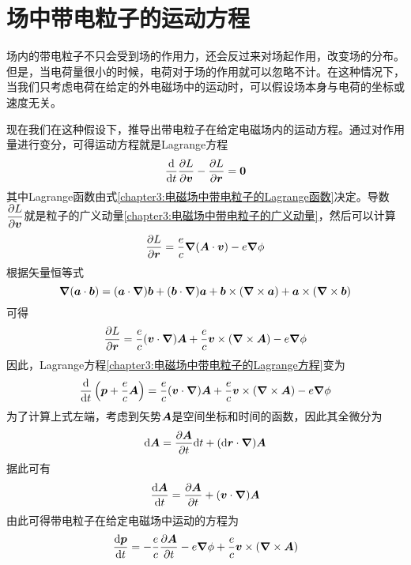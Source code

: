 \section{场中带电粒子的运动方程}

场内的带电粒子不只会受到场的作用力，还会反过来对场起作用，改变场的分布。但是，当电荷量很小的时候，电荷对于场的作用就可以忽略不计。在这种情况下，当我们只考虑电荷在给定的外电磁场中的运动时，可以假设场本身与电荷的坐标或速度无关。

现在我们在这种假设下，推导出带电粒子在给定电磁场内的运动方程。通过对作用量进行变分，可得运动方程就是Lagrange方程
\begin{equation}
	\frac{\mathrm{d}}{\mathrm{d} t} \frac{\partial L}{\partial \boldsymbol{v}} - \frac{\partial L}{\partial \boldsymbol{r}} = \boldsymbol{0}
	\label{chapter3:电磁场中带电粒子的Lagrange方程}
\end{equation}
其中Lagrange函数由式\eqref{chapter3:电磁场中带电粒子的Lagrange函数}决定。导数$\dfrac{\partial L}{\partial \boldsymbol{v}}$就是粒子的广义动量\eqref{chapter3:电磁场中带电粒子的广义动量}，然后可以计算
\begin{equation*}
	\frac{\partial L}{\partial \boldsymbol{r}} = \dfrac{e}{c}\boldsymbol{\nabla} (\boldsymbol{A}\cdot \boldsymbol{v}) - e\boldsymbol{\nabla} \phi
\end{equation*}
根据矢量恒等式
\begin{equation*}
	\boldsymbol{\nabla} (\boldsymbol{a}\cdot \boldsymbol{b}) = (\boldsymbol{a}\cdot \boldsymbol{\nabla})\boldsymbol{b} + (\boldsymbol{b}\cdot \boldsymbol{\nabla})\boldsymbol{a} + \boldsymbol{b}\times (\boldsymbol{\nabla} \times \boldsymbol{a}) + \boldsymbol{a}\times (\boldsymbol{\nabla} \times \boldsymbol{b})
\end{equation*}
可得
\begin{equation*}
	\frac{\partial L}{\partial \boldsymbol{r}} = \dfrac{e}{c}(\boldsymbol{v}\cdot \boldsymbol{\nabla})\boldsymbol{A} + \dfrac{e}{c}\boldsymbol{v}\times (\boldsymbol{\nabla} \times \boldsymbol{A}) - e\boldsymbol{\nabla} \phi
\end{equation*}
因此，Lagrange方程\eqref{chapter3:电磁场中带电粒子的Lagrange方程}变为
\begin{equation*}
	\frac{\mathrm{d}}{\mathrm{d} t}\left(\boldsymbol{p}+\dfrac{e}{c}\boldsymbol{A}\right) = \dfrac{e}{c}(\boldsymbol{v}\cdot \boldsymbol{\nabla})\boldsymbol{A} + \dfrac{e}{c}\boldsymbol{v}\times (\boldsymbol{\nabla} \times \boldsymbol{A}) - e\boldsymbol{\nabla} \phi
\end{equation*}
为了计算上式左端，考虑到矢势$\boldsymbol{A}$是空间坐标和时间的函数，因此其全微分为
\begin{equation*}
	\mathrm{d} \boldsymbol{A} = \frac{\partial \boldsymbol{A}}{\partial t}\mathrm{d} t + (\mathrm{d} \boldsymbol{r}\cdot \boldsymbol{\nabla}) \boldsymbol{A}
\end{equation*}
据此可有
\begin{equation*}
	\frac{\mathrm{d} \boldsymbol{A}}{\mathrm{d} t} = \frac{\partial \boldsymbol{A}}{\partial t} + (\boldsymbol{v}\cdot \boldsymbol{\nabla})\boldsymbol{A}
\end{equation*}
由此可得带电粒子在给定电磁场中运动的方程为
\begin{equation}
	\frac{\mathrm{d} \boldsymbol{p}}{\mathrm{d} t} = -\dfrac{e}{c}\frac{\partial \boldsymbol{A}}{\partial t} - e\boldsymbol{\nabla} \phi + \dfrac{e}{c}\boldsymbol{v}\times (\boldsymbol{\nabla} \times \boldsymbol{A})
	\label{chapter3:带电粒子在给定电磁场中的运动方程}
\end{equation}

